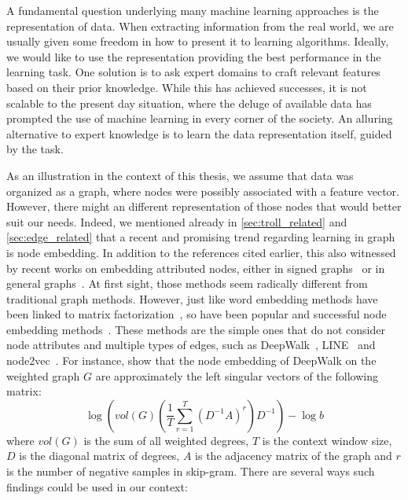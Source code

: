 A fundamental question underlying many machine learning approaches is the representation of data.
When extracting information from the real world, we are usually given some freedom in how to present
it to learning algorithms. Ideally, we would like to use the representation providing the best
performance in the learning task. One solution is to ask expert domains to craft relevant features
based on their prior knowledge. While this has achieved successes, it is not scalable to the present
day situation, where the deluge of available data has prompted the use of machine learning in every
corner of the society. An alluring alternative to expert knowledge is to learn the data
representation itself, guided by the task.

As an illustration in the context of this thesis, we assume that data was organized as a graph,
where nodes were possibly associated with a feature vector. However, there might an different
representation of those nodes that would better suit our needs. Indeed,
we mentioned already in \autoref{sec:troll_related} and \autoref{sec:edge_related} that a recent and
promising trend regarding learning in graph is node embedding. In addition to the references cited
earlier, this also witnessed by recent works on embedding attributed nodes, either in signed
graphs~\autocites{SignedFS17}{attributedSNE17}{SHINE18} or in general
graphs~\autocites{Liao2017}{AANE17}{DynamicEmbedding17}. At first sight, those methods seem
radically different from traditional graph methods. However, just like word embedding methods have
been linked to matrix
factorization~\autocites{WordEmbeddingAsFactorization14}{Hellinger14}{AroraRandWalk16}, so have been
popular and successful node embedding methods~\autocite{embeddingAsFactorization18}. These methods
are the simple ones that do not consider node attributes and multiple types of edges, such as
DeepWalk~\autocite{DeepWalk14}, LINE~\autocite{LINE15} and node2vec~\autocite{node2vec16}. For
instance, \textcite{embeddingAsFactorization18} show that the node embedding of DeepWalk on the
weighted graph $G$ are approximately the left singular vectors of the following matrix:
\begin{equation}
  \label{eq:deepwalk}
  \log \left( vol(G) \left( \frac{1}{T} \sum_{r=1}^T (D^{-1}A)^r\right) D^{-1} \right) - \log b
\end{equation}
where $vol(G)$ is the sum of all weighted degrees, $T$ is the context window size, $D$ is the
diagonal matrix of degrees, $A$ is the adjacency matrix of the graph and $r$ is the number of
negative samples in skip-gram. There are several ways such findings could be used in our context:
